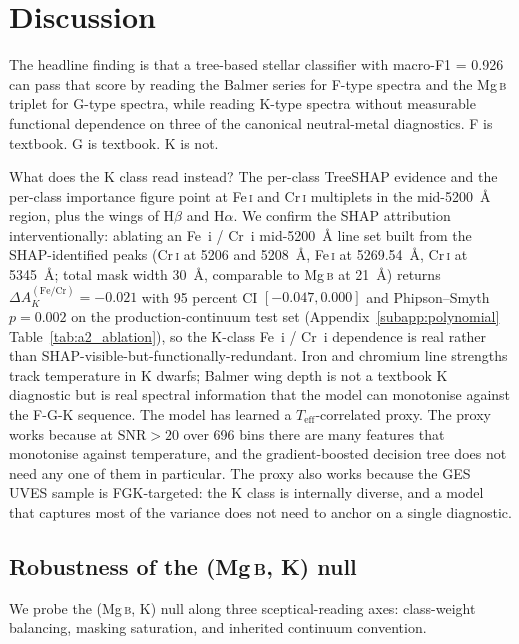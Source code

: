 \documentclass[11pt,a4paper]{article}
\newcommand{\Halpha}{H$\alpha$\xspace}
\newcommand{\Hbeta}{H$\beta$\xspace}
\newcommand{\Mgb}{Mg\,\textsc{b}\xspace}
\newcommand{\FeI}{Fe\,\textsc{i}\xspace}
\newcommand{\CrI}{Cr\,\textsc{i}\xspace}
\newcommand{\Teff}{$T_{\mathrm{eff}}$\xspace}
\newcommand{\dA}{\Delta A}
\begin{document}
\section{Discussion}
\label{sec:discussion}

The headline finding is that a tree-based stellar classifier with macro-F1 = 0.926 can pass that score by reading the Balmer series for F-type spectra and the \Mgb triplet for G-type spectra, while reading K-type spectra without measurable functional dependence on three of the canonical neutral-metal diagnostics. F is textbook. G is textbook. K is not.

What does the K class read instead? The per-class TreeSHAP evidence and the per-class importance figure point at \FeI and \CrI multiplets in the mid-5200~\AA{} region, plus the wings of \Hbeta and \Halpha. We confirm the SHAP attribution interventionally: ablating an Fe~i / Cr~i mid-5200~\AA{} line set built from the SHAP-identified peaks (\CrI at 5206 and 5208~\AA{}, \FeI at 5269.54~\AA{}, \CrI at 5345~\AA{}; total mask width 30~\AA{}, comparable to \Mgb at 21~\AA{}) returns $\dA_K^{(\mathrm{Fe}/\mathrm{Cr})} = -0.021$ with 95 percent CI $[-0.047, 0.000]$ and Phipson--Smyth $p = 0.002$ on the production-continuum test set (Appendix~\ref{subapp:polynomial} Table~\ref{tab:a2_ablation}), so the K-class Fe~i / Cr~i dependence is real rather than SHAP-visible-but-functionally-redundant. Iron and chromium line strengths track temperature in K dwarfs; Balmer wing depth is not a textbook K diagnostic but is real spectral information that the model can monotonise against the F-G-K sequence. The model has learned a \Teff-correlated proxy. The proxy works because at $\mathrm{SNR} > 20$ over 696 bins there are many features that monotonise against temperature, and the gradient-boosted decision tree does not need any one of them in particular. The proxy also works because the GES UVES sample is FGK-targeted: the K class is internally diverse, and a model that captures most of the variance does not need to anchor on a single diagnostic.

\subsection{\texorpdfstring{Robustness of the (\Mgb, K) null}{Robustness of the (Mg b, K) null}}
\label{subsec:robustness}

We probe the (\Mgb, K) null along three sceptical-reading axes: class-weight balancing, masking saturation, and inherited continuum convention.
\end{document}
